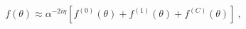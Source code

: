 \begin{equation}
f(\theta)\approx\alpha^{-2i\eta}\left[f^{(0)}(\theta)+f^{(1)}(\theta)+
f^{(C)}(\theta)\right] \ ,
\end{equation}

